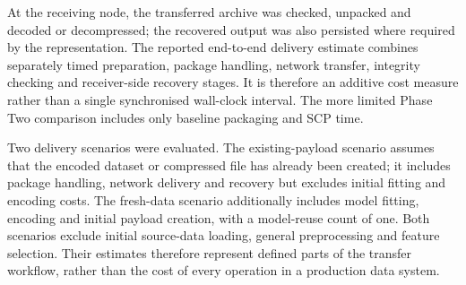 At the receiving node, the transferred archive was checked, unpacked and
decoded or decompressed; the recovered output was also persisted where
required by the representation. The reported end-to-end delivery
estimate combines separately timed preparation, package handling,
network transfer, integrity checking and receiver-side recovery stages.
It is therefore an additive cost measure rather than a single
synchronised wall-clock interval. The more limited Phase Two comparison
includes only baseline packaging and SCP time.

Two delivery scenarios were evaluated. The existing-payload scenario
assumes that the encoded dataset or compressed file has already been
created; it includes package handling, network delivery and recovery but
excludes initial fitting and encoding costs. The fresh-data scenario
additionally includes model fitting, encoding and initial payload
creation, with a model-reuse count of one. Both scenarios exclude
initial source-data loading, general preprocessing and feature
selection. Their estimates therefore represent defined parts of the
transfer workflow, rather than the cost of every operation in a
production data system.

